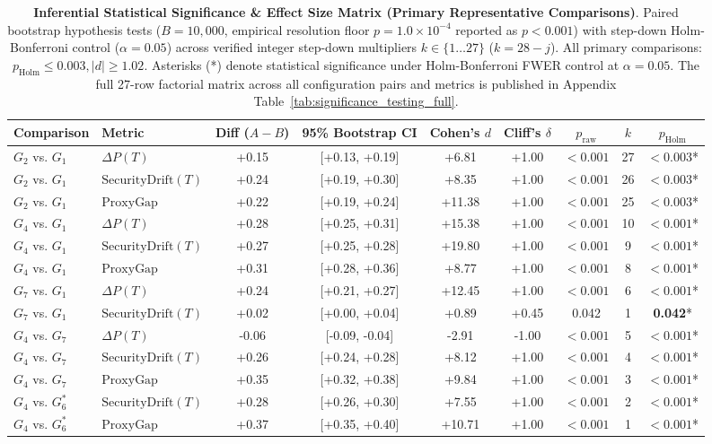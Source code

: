 \documentclass[conference]{IEEEtran}
\begin{document}
\begin{table}[t]
\centering
\small
\caption{\textbf{Inferential Statistical Significance \& Effect Size Matrix (Primary Representative Comparisons)}. Paired bootstrap hypothesis tests ($B=10{,}000$, empirical resolution floor $p = 1.0 \times 10^{-4}$ reported as $p < 0.001$) with step-down Holm-Bonferroni control ($\alpha=0.05$) across verified integer step-down multipliers $k \in \{1 \dots 27\}$ ($k = 28 - j$). All primary comparisons: $p_{\text{Holm}}\le 0.003, |d|\ge 1.02$. Asterisks (*) denote statistical significance under Holm-Bonferroni FWER control at $\alpha = 0.05$. The full 27-row factorial matrix across all configuration pairs and metrics is published in Appendix Table~\ref{tab:significance_testing_full}.}
\label{tab:significance_testing}
\begin{tabular}{llccccccc}
\toprule
\textbf{Comparison} & \textbf{Metric} & \textbf{Diff ($A-B$)} & \textbf{95\% Bootstrap CI} & \textbf{Cohen's $d$} & \textbf{Cliff's $\delta$} & \textbf{$p_{\text{raw}}$} & \textbf{$k$} & \textbf{$p_{\text{Holm}}$} \\
\midrule
$G_2$ vs. $G_1$ & $\Delta P(T)$ & +0.15 & [+0.13, +0.19] & +6.81 & +1.00 & $<0.001$ & 27 & \textbf{$<0.003$}* \\
$G_2$ vs. $G_1$ & $\text{SecurityDrift}(T)$ & +0.24 & [+0.19, +0.30] & +8.35 & +1.00 & $<0.001$ & 26 & \textbf{$<0.003$}* \\
$G_2$ vs. $G_1$ & $\text{ProxyGap}$ & +0.22 & [+0.19, +0.24] & +11.38 & +1.00 & $<0.001$ & 25 & \textbf{$<0.003$}* \\
$G_4$ vs. $G_1$ & $\Delta P(T)$ & +0.28 & [+0.25, +0.31] & +15.38 & +1.00 & $<0.001$ & 10 & \textbf{$<0.001$}* \\
$G_4$ vs. $G_1$ & $\text{SecurityDrift}(T)$ & +0.27 & [+0.25, +0.28] & +19.80 & +1.00 & $<0.001$ & 9 & \textbf{$<0.001$}* \\
$G_4$ vs. $G_1$ & $\text{ProxyGap}$ & +0.31 & [+0.28, +0.36] & +8.77 & +1.00 & $<0.001$ & 8 & \textbf{$<0.001$}* \\
$G_7$ vs. $G_1$ & $\Delta P(T)$ & +0.24 & [+0.21, +0.27] & +12.45 & +1.00 & $<0.001$ & 6 & \textbf{$<0.001$}* \\
$G_7$ vs. $G_1$ & $\text{SecurityDrift}(T)$ & +0.02 & [+0.00, +0.04] & +0.89 & +0.45 & 0.042 & 1 & \textbf{0.042}* \\
$G_4$ vs. $G_7$ & $\Delta P(T)$ & -0.06 & [-0.09, -0.04] & -2.91 & -1.00 & $<0.001$ & 5 & \textbf{$<0.001$}* \\
$G_4$ vs. $G_7$ & $\text{SecurityDrift}(T)$ & +0.26 & [+0.24, +0.28] & +8.12 & +1.00 & $<0.001$ & 4 & \textbf{$<0.001$}* \\
$G_4$ vs. $G_7$ & $\text{ProxyGap}$ & +0.35 & [+0.32, +0.38] & +9.84 & +1.00 & $<0.001$ & 3 & \textbf{$<0.001$}* \\
$G_4$ vs. $G_6^*$ & $\text{SecurityDrift}(T)$ & +0.28 & [+0.26, +0.30] & +7.55 & +1.00 & $<0.001$ & 2 & \textbf{$<0.001$}* \\
$G_4$ vs. $G_6^*$ & $\text{ProxyGap}$ & +0.37 & [+0.35, +0.40] & +10.71 & +1.00 & $<0.001$ & 1 & \textbf{$<0.001$}* \\
\bottomrule
\end{tabular}
\end{table}
\end{document}
